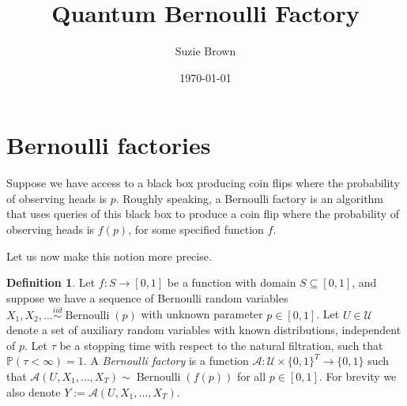 \documentclass{article}
\title{Quantum Bernoulli Factory}
\author{Suzie Brown}
\date{\today}
\theoremstyle{definition}
\newtheorem{defn}{Definition}
\newcommand{\PR}{\mathbb{P}}
\newcommand{\iidsim}{\overset{iid}{\sim}}
\newcommand{\Bern}{\operatorname{Bernoulli}}
\newcommand{\A}{\mathcal{A}}
\begin{document}
\maketitle
\section*{Bernoulli factories}
Suppose we have access to a black box producing coin flips where the probability of observing heads is $p$. Roughly speaking, a Bernoulli factory is an algorithm that uses queries of this black box to produce a coin flip where the probability of observing heads is $f(p)$, for some specified function $f$.

Let us now make this notion more precise.
\begin{defn}\label{defn:bern_fact}
Let $f: S\to[0,1]$ be a function with domain $S \subseteq [0,1]$, and suppose we have a sequence of Bernoulli random variables $X_1,X_2,\dots \iidsim \Bern(p)$ with unknown parameter $p \in [0,1]$. 
Let $U \in \mathcal{U}$ denote a set of auxiliary random variables with known distributions, independent of $p$. Let $\tau$ be a stopping time with respect to the natural filtration, such that $\PR(\tau<\infty)=1$.
A \emph{Bernoulli factory} is a function $\A : \mathcal{U} \times \{0,1\}^T \to\{0,1\}$ such that $\A(U,X_1,\dots,X_T) \sim \Bern(f(p))$ for all $p \in [0,1]$. For brevity we also denote $Y := \A(U,X_1,\dots,X_T)$.
\end{defn}

\end{document}
